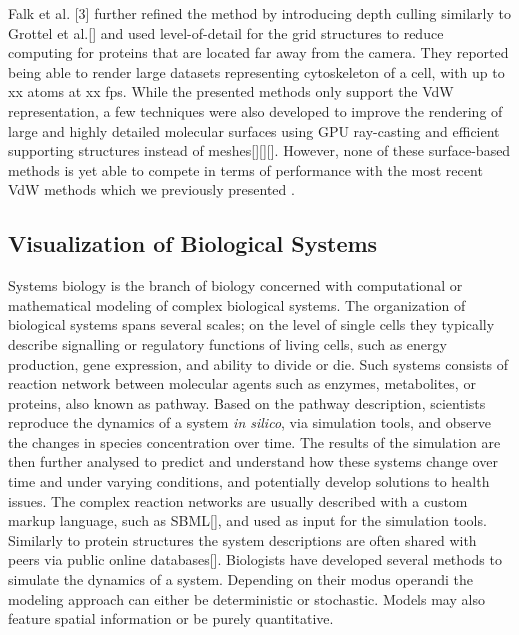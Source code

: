 Falk et al. [3] further refined the method by introducing depth culling similarly to Grottel et al.[] and used level-of-detail for the grid structures to reduce computing for proteins that are located far away from the camera.
They reported being able to render large datasets representing cytoskeleton of a cell, with up to xx atoms at xx fps.
While the presented methods only support the VdW representation, a few techniques were also developed to improve the rendering of large and highly detailed molecular surfaces using GPU ray-casting and efficient supporting structures instead of meshes[][][]. 
However, none of these surface-based methods is yet able to compete in terms of performance with the most recent VdW methods which we previously presented .

\subsection{Visualization of Biological Systems}

Systems biology is the branch of biology concerned with computational or mathematical modeling of complex biological systems.
The organization of biological systems spans several scales; on the level of single cells they typically describe signalling or regulatory functions of living cells, such as energy production, gene expression, and ability to divide or die.
Such systems consists of reaction network between molecular agents such as enzymes, metabolites, or proteins, also known as pathway.
Based on the pathway description, scientists reproduce the dynamics of a system \textit{in silico}, via simulation tools, and observe the changes in species concentration over time.
The results of the simulation are then further analysed to predict and understand how these systems change over time and under varying conditions, and potentially develop solutions to health issues.
The complex reaction networks are usually described with a custom markup language, such as SBML[], and used as input for the simulation tools.
Similarly to protein structures the system descriptions are often shared with peers via public online databases[].
Biologists have developed several methods to simulate the dynamics of a system.
Depending on their modus operandi the modeling approach can either be deterministic or stochastic.
Models may also feature spatial information or be purely quantitative. 


